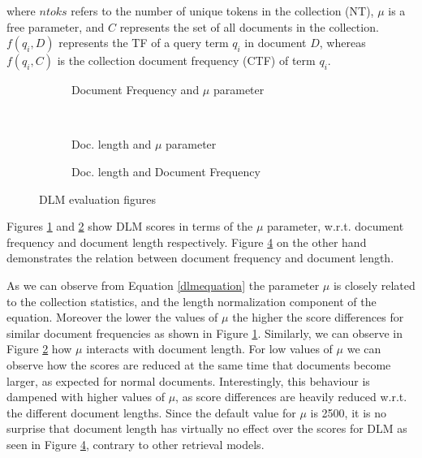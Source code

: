 \noindent where $ntoks$ refers to the number of unique tokens in the collection (NT), $\mu$ is a free parameter, and $C$ represents the set of all documents in the collection. $f(q_i, D)$ represents the TF of a query term $q_i$ in document $D$, whereas $f(q_i, C)$ is the collection document frequency (CTF) of term $q_i$.

\begin{figure}
 		\begin{subfigure}[]{0.5\textwidth}
     	\caption{Document Frequency and $\mu$ parameter} 
    	
     	\label{dlmproofc2}
        \end{subfigure}
        ~
		\begin{subfigure}[]{0.5\textwidth}
           \caption{Doc. length and $\mu$ parameter}
           
           \label{dlmproofcc}          
        \end{subfigure}
        
		\begin{subfigure}[]{\textwidth}
          \caption{Doc. length and Document Frequency}
          
          \label{dlmproof}          
        \end{subfigure}

        \caption{DLM evaluation figures}
\end{figure}

Figures \ref{dlmproofc2} and \ref{dlmproofcc} show DLM scores in terms of the $\mu$ parameter, w.r.t. document frequency and document length respectively. Figure \ref{dlmproof} on the other hand demonstrates the relation between document frequency and document length.

As we can observe from Equation \ref{dlmequation} the parameter $\mu$ is closely related to the collection statistics, and the length normalization component of the equation. Moreover the lower the values of $\mu$ the higher the score differences for similar document frequencies as shown in Figure \ref{dlmproofc2}. Similarly, we can observe in Figure \ref{dlmproofcc} how $\mu$ interacts with document length. For low values of $\mu$ we can observe how the scores are reduced at the same time that documents become larger, as expected for normal documents. Interestingly, this behaviour is dampened with higher values of $\mu$, as score differences are heavily reduced w.r.t. the different document lengths. Since the default value for $\mu$ is 2500, it is no surprise that document length has virtually no effect over the scores for DLM as seen in Figure \ref{dlmproof}, contrary to other retrieval models. 


